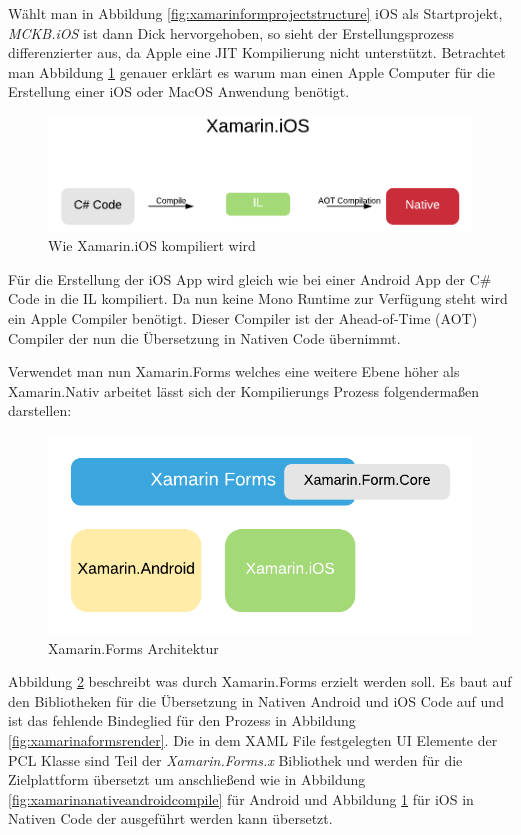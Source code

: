 	Wählt man in Abbildung \ref{fig:xamarinformprojectstructure} iOS als Startprojekt, \textit{MCKB.iOS} ist dann Dick hervorgehoben, so sieht der Erstellungsprozess differenzierter aus, da Apple eine JIT Kompilierung nicht unterstützt. Betrachtet man Abbildung \ref{fig:xamarinanativeioscompile} genauer erklärt es warum man einen Apple Computer für die Erstellung einer iOS oder MacOS Anwendung benötigt.
	\begin{figure}[h!]
		\centering
		\includegraphics[width=1\textwidth]{images/Xamarin-iOS.png}
		\caption{Wie Xamarin.iOS kompiliert wird}
		\label{fig:xamarinanativeioscompile}
	\end{figure}

	Für die Erstellung der iOS App wird gleich wie bei einer Android App der C\# Code in die IL kompiliert. Da nun keine Mono Runtime zur Verfügung steht wird ein Apple Compiler benötigt. Dieser Compiler ist der Ahead-of-Time (AOT) Compiler der nun die Übersetzung in Nativen Code übernimmt.

	Verwendet man nun Xamarin.Forms welches eine weitere Ebene höher als Xamarin.Nativ arbeitet lässt sich der Kompilierungs Prozess folgendermaßen darstellen:
	\begin{figure}[h!]
		\centering
		\includegraphics[width=1\textwidth]{images/Xamarin-Forms.png}
		\caption{Xamarin.Forms Architektur}
		\label{fig:xamarinformsarchitecture}
	\end{figure}

	Abbildung \ref{fig:xamarinformsarchitecture} beschreibt was durch Xamarin.Forms erzielt werden soll. Es baut auf den Bibliotheken für die Übersetzung in Nativen Android und iOS Code auf und ist das fehlende Bindeglied für den Prozess in Abbildung \ref{fig:xamarinaformsrender}. Die in dem XAML File festgelegten UI Elemente der PCL Klasse sind Teil der \textit{Xamarin.Forms.x} Bibliothek und werden für die Zielplattform übersetzt um anschließend wie in Abbildung \ref{fig:xamarinanativeandroidcompile} für Android und Abbildung \ref{fig:xamarinanativeioscompile} für iOS in Nativen Code der ausgeführt werden kann übersetzt.
	\newpage


